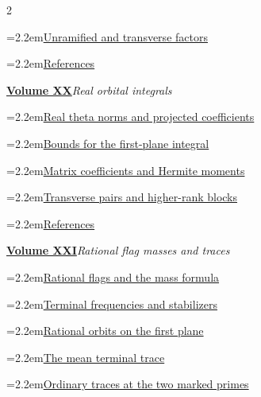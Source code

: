 \documentclass[a4paper,11pt]{article}
\theoremstyle{definition}
\theoremstyle{remark}
\numberwithin{equation}{section}
\begin{document}
\begin{multicols}{2}
\begin{minipage}{\linewidth}
\noindent\hangindent=2.2em\hyperref[nav:g-IX-4]{Unramified and transverse factors}\par
\noindent\hangindent=2.2em\hyperref[nav:bibliography-XIX]{References}\par
\end{minipage}\par\medskip
\noindent\begin{minipage}{\linewidth}\raggedright
\textbf{\hyperref[nav:volume-XX]{Volume XX}}\enspace\emph{Real orbital integrals}\par\smallskip
\noindent\hangindent=2.2em\hyperref[nav:g-X-0]{Real theta norms and projected coefficients}\par
\noindent\hangindent=2.2em\hyperref[nav:g-X-1]{Bounds for the first-plane integral}\par
\noindent\hangindent=2.2em\hyperref[nav:g-X-2]{Matrix coefficients and Hermite moments}\par
\noindent\hangindent=2.2em\hyperref[nav:g-X-3]{Transverse pairs and higher-rank blocks}\par
\noindent\hangindent=2.2em\hyperref[nav:bibliography-XX]{References}\par
\end{minipage}\par\medskip
\noindent\begin{minipage}{\linewidth}\raggedright
\textbf{\hyperref[nav:volume-XXI]{Volume XXI}}\enspace\emph{Rational flag masses and traces}\par\smallskip
\noindent\hangindent=2.2em\hyperref[nav:g-XI-0]{Rational flags and the mass formula}\par
\noindent\hangindent=2.2em\hyperref[nav:g-XI-1]{Terminal frequencies and stabilizers}\par
\noindent\hangindent=2.2em\hyperref[nav:g-XI-2]{Rational orbits on the first plane}\par
\noindent\hangindent=2.2em\hyperref[nav:g-XI-3]{The mean terminal trace}\par
\noindent\hangindent=2.2em\hyperref[nav:chapter-marked-ordinary-traces]{Ordinary traces at the two marked primes}\par

\end{minipage}
\end{multicols}
\end{document}
